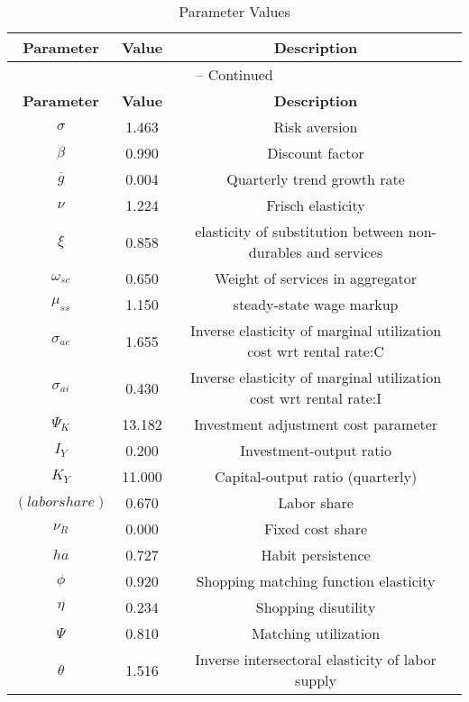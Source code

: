 \begin{center}
\begin{longtable}{ccc}
\caption{Parameter Values}\\%
\toprule%
\multicolumn{1}{c}{\textbf{Parameter}} &
\multicolumn{1}{c}{\textbf{Value}} &
 \multicolumn{1}{c}{\textbf{Description}}\\%
\midrule%
\endfirsthead
\multicolumn{3}{c}{{\tablename} \thetable{} -- Continued}\\%
\midrule%
\multicolumn{1}{c}{\textbf{Parameter}} &
\multicolumn{1}{c}{\textbf{Value}} &
  \multicolumn{1}{c}{\textbf{Description}}\\%
\midrule%
\endhead
${\sigma}$ 	 & 	 1.463 	 & 	 Risk aversion\\
${\beta}$ 	 & 	 0.990 	 & 	 Discount factor\\
${\overline{g}}$ 	 & 	 0.004 	 & 	 Quarterly trend growth rate\\
$\nu$ 	 & 	 1.224 	 & 	 Frisch elasticity\\
$\xi$ 	 & 	 0.858 	 & 	 elasticity of substitution between non-durables and services\\
$\omega_{sc}$ 	 & 	 0.650 	 & 	 Weight of services in aggregator\\
$\mu_{ss}$ 	 & 	 1.150 	 & 	 steady-state wage markup\\
${\sigma_{ac}}$ 	 & 	 1.655 	 & 	 Inverse elasticity of marginal utilization cost wrt rental rate:C\\
${\sigma_{ai}}$ 	 & 	 0.430 	 & 	 Inverse elasticity of marginal utilization cost wrt rental rate:I\\
${\Psi_{K}}$ 	 & 	 13.182 	 & 	 Investment adjustment cost parameter\\
${I_Y}$ 	 & 	 0.200 	 & 	 Investment-output ratio\\
${K_Y}$ 	 & 	 11.000 	 & 	 Capital-output ratio (quarterly)\\
$(labor share)$ 	 & 	 0.670 	 & 	 Labor share\\
${\nu_R}$ 	 & 	 0.000 	 & 	 Fixed cost share\\
${ha}$ 	 & 	 0.727 	 & 	 Habit persistence\\
${\phi}$ 	 & 	 0.920 	 & 	 Shopping matching function elasticity\\
${\eta}$ 	 & 	 0.234 	 & 	 Shopping disutility\\
${\Psi}$ 	 & 	 0.810 	 & 	 Matching utilization\\
${\theta}$ 	 & 	 1.516 	 & 	 Inverse intersectoral elasticity of labor supply\\

\end{longtable}
\end{center}

